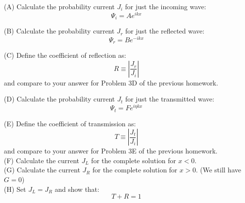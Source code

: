 \documentclass[12pt]{article}
\begin{document}
\noindent
(A) Calculate the probability current $J_i$ for just the incoming wave:
$$\Psi_i = A e^{ikx}$$

\noindent
(B) Calculate the probability current $J_r$ for just the reflected wave:
$$\Psi_r = B e^{-ikx}$$

\noindent
(C) Define the coefficient of reflection as:
$$R \equiv \left\lvert \frac{J_r}{J_i} \right\rvert $$
and compare to your answer for Problem 3D of the previous homework.

\noindent
(D) Calculate the probability current $J_t$ for just the transmitted wave:
$$\Psi_t = F e^{i\eta kx}$$

\noindent
(E) Define the coefficient of transmission as:
$$T \equiv \left\lvert  \frac{J_t}{J_i} \right\rvert $$
and compare to your answer for Problem 3E of the previous homework.\\[5pt]

\noindent
(F) Calculate the current $J_L$ for the complete solution for $x<0$.\\[5pt]

\noindent
(G) Calculate the current $J_R$ for the complete solution for $x>0$. (We still have $G=0$)\\[5pt]

\noindent
(H) Set $J_L = J_R$ and show that:
$$T + R = 1$$
\end{document}
